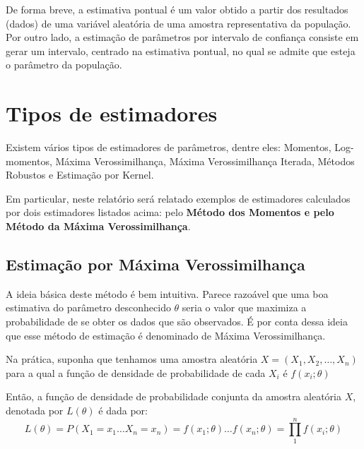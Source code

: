 De forma breve, a estimativa pontual é um valor obtido a partir dos resultados (dados) de uma variável aleatória de uma amostra representativa da população. Por outro lado, a estimação de parâmetros por intervalo de confiança consiste em gerar um intervalo, centrado na estimativa pontual, no qual se admite que esteja o parâmetro da população.






\section{Tipos de estimadores}

Existem vários tipos de estimadores de parâmetros, dentre eles: Momentos, Log-momentos, Máxima Verossimilhança, Máxima Verossimilhança Iterada, Métodos Robustos e Estimação por Kernel.

Em particular, neste relatório será relatado exemplos de estimadores calculados por dois estimadores listados acima: pelo \textbf{Método dos Momentos e pelo Método da Máxima Verossimilhança}.


\subsection{Estimação por Máxima Verossimilhança}

A ideia básica deste método é bem intuitiva. Parece razoável que uma boa estimativa do parâmetro desconhecido \begin{math} \theta \end{math} seria o valor que maximiza a probabilidade de se obter os dados que são observados. É por conta dessa ideia que esse método de estimação é denominado de Máxima Verossimilhança. 
 
Na prática, suponha que tenhamos uma amostra aleatória \begin{math} X = (X_{1}, X_{2}, \dots, X_{n}) \end{math}
para a qual a função de densidade de probabilidade de cada \begin{math} X_{i} \end{math} é \begin{math} f(x_{i}; \theta)\end{math} 

Então, a função de densidade de probabilidade conjunta da amostra aleatória \begin{math} X \end{math}, denotada por \begin{math} L(\theta) \end{math} é dada por:
\begin{equation}
L(\theta) = P (X_{1} = x_{1} \dots X_{n} = x_{n}) =  f(x_{1}; \theta) \dots f(x_{n}; \theta) =  \prod_{1}^{n} f(x_{i}; \theta)
\end{equation}

